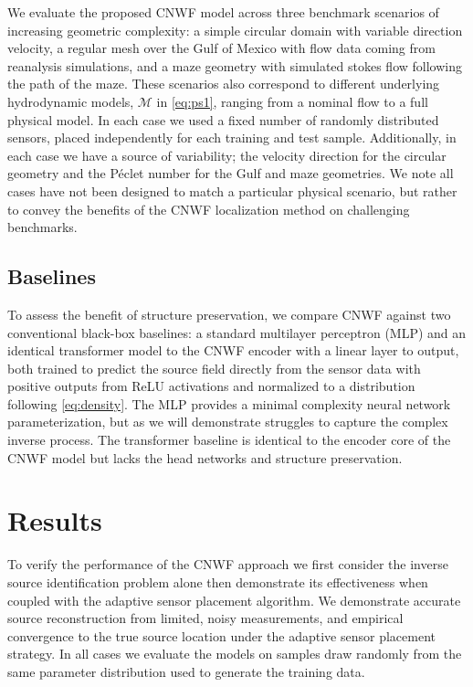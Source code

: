 \documentclass[onefignum,onetabnum]{siamart171218} %
\begin{document}
We evaluate the proposed CNWF model across three benchmark scenarios of increasing geometric complexity: a simple circular domain with variable direction velocity, a regular mesh over the Gulf of Mexico with flow data coming from reanalysis simulations, and a maze geometry with simulated stokes flow following the path of the maze. These scenarios also correspond to different underlying hydrodynamic models, \(\mathcal{M}\) in \eqref{eq:ps1}, ranging from a nominal flow to a full physical model. In each case we used a fixed number of randomly distributed sensors, placed independently for each training and test sample.
Additionally, in each case we have a source of variability; the velocity direction for the circular geometry and the P\'eclet number for the Gulf and maze geometries. We note all cases have not been designed to match a particular physical scenario, but rather to convey the benefits of the CNWF localization method on challenging benchmarks.

\subsection{Baselines}
\label{sec:baselines}
To assess the benefit of structure preservation, we compare CNWF against two conventional black-box baselines: a standard multilayer perceptron (MLP) and an identical transformer model to the CNWF encoder with a linear layer to output, both trained to predict the source field directly from the sensor data with positive outputs from ReLU activations and normalized to a distribution following \eqref{eq:density}. The MLP provides a minimal complexity neural network parameterization, but as we will demonstrate struggles to capture the complex inverse process. The transformer baseline is identical to the encoder core of the CNWF model but lacks the head networks and structure preservation.


\section{Results}
\label{sec:results}

To verify the performance of the CNWF approach we first consider the inverse source identification problem alone then demonstrate its effectiveness when coupled with the adaptive sensor placement algorithm. We demonstrate accurate source reconstruction from limited, noisy measurements, and empirical convergence to the true source location under the adaptive sensor placement strategy. In all cases we evaluate the models on samples draw randomly from the same parameter distribution used to generate the training data.
\end{document}

